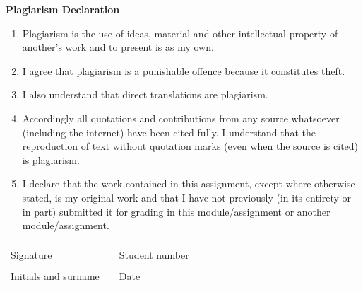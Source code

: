 \documentclass[11pt,a4paper]{article}
\begin{document}
{\Large \bf Plagiarism Declaration}
\begin{enumerate}
\item Plagiarism is the use of ideas, material and other intellectual property of another's work and to present is as my own.
\item I agree that plagiarism is a punishable offence because it constitutes theft.
\item I also understand that direct translations are plagiarism.
\item Accordingly all quotations and contributions from any source whatsoever (including the internet) have been cited fully. I understand that the reproduction of text without quotation marks (even when the source is cited) is plagiarism.
\item I declare that the work contained in this assignment, except where otherwise stated, is my original work and that I have not previously (in its entirety or in part) submitted it for grading in this module/assignment or another module/assignment.
\end{enumerate}
\vspace{1cm}
\begin{table}[ht]
	\begin{center}
		\begin{tabular*}{15.5cm}{@{\extracolsep{\fill}}lll}
			\makebox[8cm]{\hrulefill} & & \makebox[6cm]{\hrulefill}\\
			Signature & & Student number\\[1cm]
			\makebox[8cm]{\hrulefill} & & \makebox[6cm]{\hrulefill}\\ 
			Initials and surname & & Date \\
		\end{tabular*}
	\end{center}
\end{table}
\newpage

\begin{abstract}

\end{abstract}
\newpage
\end{document}
